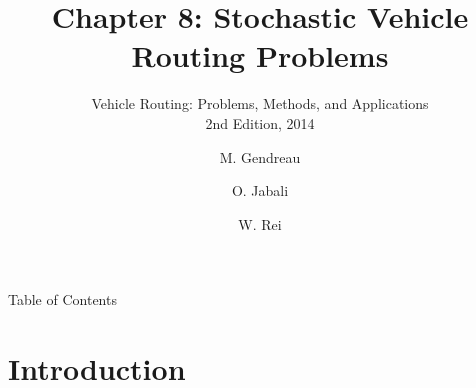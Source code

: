 \documentclass[aspectratio=169,10pt]{beamer}
\title[Ch.\ 8: Stochastic VRP]{%
  Chapter 8: Stochastic Vehicle Routing Problems}
\subtitle{Vehicle Routing: Problems, Methods, and Applications\\
  2nd Edition, 2014}
\author{M. Gendreau \and O. Jabali \and W. Rei}
\institute{Slides prepared from the textbook chapter}
\date{}
\begin{document}

\begin{frame}
  \titlepage
\end{frame}

\begin{frame}[allowframebreaks]{Table of Contents}
  \tableofcontents
\end{frame}

\section{Introduction}
\end{document}
